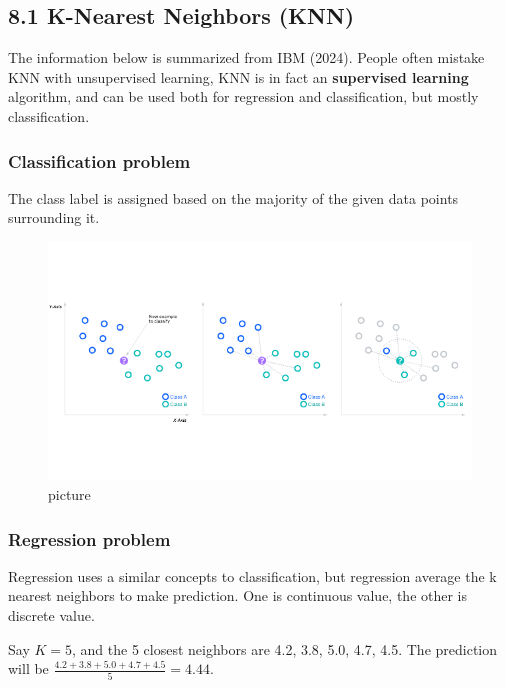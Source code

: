 \documentclass[
  letterpaper,
  DIV=11,
  numbers=noendperiod]{scrartcl}
\begin{document}
\subsection{8.1 K-Nearest Neighbors
(KNN)}\label{k-nearest-neighbors-knn}

The information below is summarized from IBM (2024). People often
mistake KNN with unsupervised learning, KNN is in fact an
\textbf{supervised learning} algorithm, and can be used both for
regression and classification, but mostly classification.

\subsubsection{Classification problem}\label{classification-problem}

The class label is assigned based on the majority of the given data
points surrounding it.

\begin{figure}[H]

{\centering \includegraphics{11.png}

}

\caption{picture}

\end{figure}%

\subsubsection{Regression problem}\label{regression-problem}

Regression uses a similar concepts to classification, but regression
average the k nearest neighbors to make prediction. One is continuous
value, the other is discrete value.

Say \(K=5\), and the 5 closest neighbors are 4.2, 3.8, 5.0, 4.7, 4.5.
The prediction will be \(\frac{4.2+3.8+5.0+4.7+4.5}{5}=4.44\).
\end{document}

